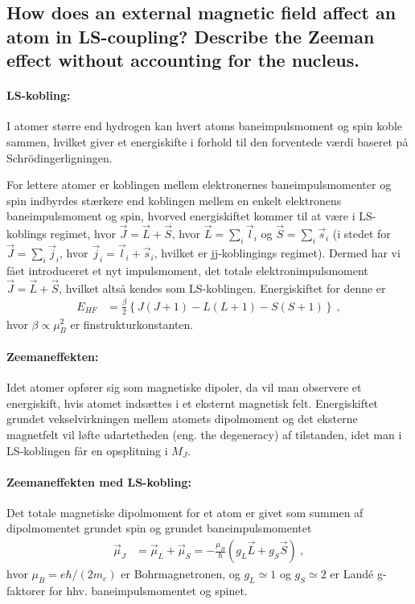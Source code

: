 \subsection{How does an external magnetic field affect an atom in LS-coupling? Describe the Zeeman effect without accounting for the nucleus.}


\paragraph{LS-kobling:} I atomer større end hydrogen kan hvert atoms baneimpulsmoment og spin koble sammen, hvilket giver et energiskifte i forhold til den forventede værdi baseret på Schrödingerligningen.

For lettere atomer er koblingen mellem elektronernes baneimpulsmomenter og spin indbyrdes stærkere end koblingen mellem en enkelt elektronens baneimpulsmoment og spin, hvorved energiskiftet kommer til at være i LS-koblings regimet, hvor $\Vec{J} = \Vec{L} + \Vec{S}$, hvor $\Vec{L} = \sum_i \Vec{l}_i$ og $\Vec{S} = \sum_i \Vec{s}_i$ (i stedet for $\Vec{J} = \sum_i \Vec{j}_i$, hvor $\Vec{j}_i = \Vec{l}_i + \Vec{s}_i$, hvilket er jj-koblingings regimet). Dermed har vi fået introduceret et nyt impulsmoment, det totale elektronimpulsmoment $\Vec{J} = \Vec{L} + \Vec{S}$, hvilket altså kendes som LS-koblingen. Energiskiftet for denne er
\begin{align}
    E_{HF} &= \frac{\beta}{2} \left\{J(J+1) - L(L+1) - S(S+1)\right\} \: ,
\end{align}
hvor $\beta \propto \mu_B^2$ er finstrukturkonstanten.


\paragraph{Zeemaneffekten:} Idet atomer opfører sig som magnetiske dipoler, da vil man observere et energiskift, hvis atomet indsættes i et eksternt magnetisk felt. Energiskiftet grundet vekselvirkningen mellem atomets dipolmoment og det eksterne magnetfelt vil løfte udartetheden (eng. the degeneracy) af tilstanden, idet man i LS-koblingen får en opsplitning i $M_J$.


\paragraph{Zeemaneffekten med LS-kobling:} Det totale magnetiske dipolmoment for et atom er givet som summen af dipolmomentet grundet spin og grundet baneimpulsmomentet
\begin{align}
    \Vec{\mu}_J &= \Vec{\mu}_L + \Vec{\mu}_S = - \frac{\mu_B}{\hbar} \left( g_L \Vec{L} + g_S \Vec{S} \right) \: ,
\end{align}
hvor $\mu_B = e\hbar/(2m_e)$ er Bohrmagnetronen, og $g_L \simeq 1$ og $g_S \simeq 2$ er Landé g-faktorer for hhv. baneimpulsmomentet og spinet.

